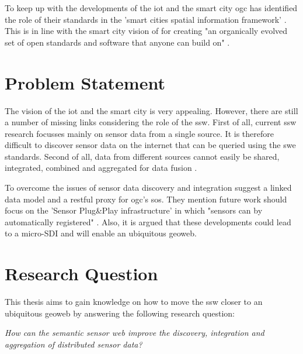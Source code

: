 To keep up with the developments of the \ac{iot} and the smart city \ac{ogc} has identified the role of their standards in the 'smart cities spatial information framework' \cite{SC:OGC}. This is in line with the smart city vision of \cite{SC:Townsend} for creating "an organically evolved set of open standards and software that anyone can build on" \citep[p. 290]{SC:Townsend}.

\section{Problem Statement}
The vision of the \ac{iot} and the smart city is very appealing. However, there are still a number of missing links considering the role of the \ac{ssw}. First of all, current \ac{ssw} research focusses mainly on sensor data from a single source. It is therefore difficult to discover sensor data on the internet that can be queried using the \ac{swe} standards. Second of all, data from different sources cannot easily be shared, integrated, combined and aggregated for data fusion \citep{SSW:Wang, SSW:Ji, SSW:Corcho}. 

To overcome the issues of sensor data discovery and integration \cite{SSW:Janowicz} suggest a linked data model and a \ac{rest}ful proxy for \ac{ogc}’s \ac{sos}. They mention future work should focus on the 'Sensor Plug\&Play infrastructure' in which "sensors can by automatically registered" \cite[p. 21]{SSW:Janowicz}. Also, it is argued that these developments could lead to a micro-SDI and will enable an ubiquitous geoweb. 

\section{Research Question}
This thesis aims to gain knowledge on how to move the \ac{ssw} closer to an ubiquitous geoweb by answering the following research question: 

\textit{How can the semantic sensor web improve the discovery, integration and aggregation of distributed sensor data?}

